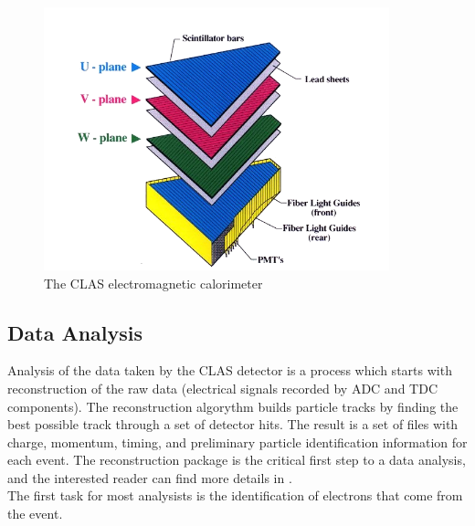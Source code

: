 \begin{figure}
  \centering
  \includegraphics[width=10cm]{image/ec.png}
  \caption{The CLAS electromagnetic calorimeter}
  \label{fig:ec_clas}
\end{figure}

\subsection{Data Analysis}
Analysis of the data taken by the CLAS detector is a process which starts with reconstruction of the raw data (electrical signals recorded by ADC and TDC components).  The reconstruction algorythm builds particle tracks by finding the best possible track through a set of detector hits.  The result is a set of files with charge, momentum, timing, and preliminary particle identification information for each event.  The reconstruction package is the critical first step to a data analysis, and the interested reader can find more details in \cite{reconstruction-doc}.\\

The first task for most analysists is the identification of electrons that come from the event.

